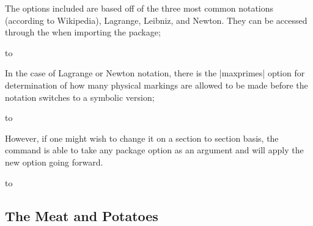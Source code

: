 \documentclass[11pt,a4paper]{ltxdoc}
\begin{document}
The options included are based off of the three most
common notations
(according to Wikipedia), Lagrange, Leibniz, and Newton. 
They can be accessed through the  when importing the package;
\par\hbox to 

In the case of Lagrange or Newton notation, there is the |maxprimes| option
for determination of how many physical markings are allowed to be
made before the notation switches to a symbolic version;
\par\hbox to 
\vspace{1ex}


\DescribeMacro{\setDE}
However, if one might wish to change it on a section to section basis,
the command  is able
to take any package option as an argument and will
apply the new option going forward.


\par\hbox to 



\subsection{The Meat and Potatoes}
\end{document}
